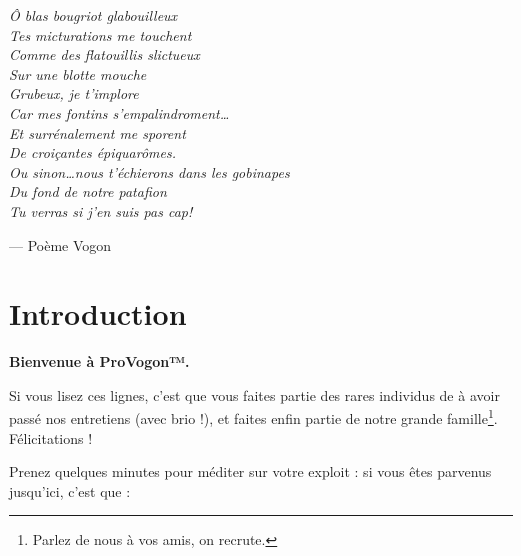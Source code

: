 \newcommand{\provogon}{ProVogon™}

\vspace{-1cm}

\noindent\emph{Ô blas bougriot glabouilleux\\
Tes micturations me touchent\\
Comme des flatouillis slictueux\\
Sur une blotte mouche\\
Grubeux, je t'implore\\
Car mes fontins s'empalindroment\ldots\\
Et surrénalement me sporent\\
De croiçantes épiquarômes.\\
Ou sinon\ldots nous t'échierons dans les gobinapes\\
Du fond de notre patafion\\
Tu verras si j'en suis pas cap!
}

\vspace{1cm}

\hspace{5cm} --- Poème Vogon

\newpage

\section{Introduction}

\vspace{1cm}

\textbf{Bienvenue à \provogon{}.}

Si vous lisez ces lignes, c'est que vous faites partie des rares individus de à
avoir passé nos entretiens (avec brio !), et faites enfin partie de notre
grande famille\footnote{Parlez de nous à vos amis, on recrute.}. Félicitations !

Prenez quelques minutes pour méditer sur votre exploit : si vous êtes parvenus
jusqu'ici, c'est que :


